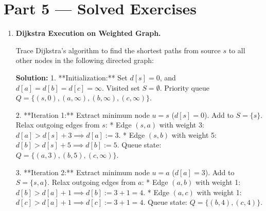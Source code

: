 \documentclass[12pt, a4paper]{book}
\begin{document}
\section{Part 5 --- Solved Exercises}

\begin{problembox}
\begin{enumerate}[label=\textbf{E\arabic*.}]
  \item \textbf{Dijkstra Execution on Weighted Graph.}
  
        Trace Dijkstra's algorithm to find the shortest paths from source $s$ to all other nodes in the following directed graph:
        \begin{center}
        \end{center}
        
        \textbf{Solution:}
        1. **Initialization:**
           Set $d[s] = 0$, and $d[a] = d[b] = d[c] = \infty$.
           Visited set $S = \emptyset$. Priority queue $Q = \{ (s,0), (a,\infty), (b,\infty), (c,\infty) \}$.
           
        2. **Iteration 1:**
           Extract minimum node $u = s$ ($d[s] = 0$). Add to $S = \{s\}$.
           Relax outgoing edges from $s$:
           * Edge $(s, a)$ with weight 3: $d[a] > d[s] + 3 \implies d[a] := 3$.
           * Edge $(s, b)$ with weight 5: $d[b] > d[s] + 5 \implies d[b] := 5$.
           Queue state: $Q = \{ (a,3), (b,5), (c,\infty) \}$.
           
        3. **Iteration 2:**
           Extract minimum node $u = a$ ($d[a] = 3$). Add to $S = \{s, a\}$.
           Relax outgoing edges from $a$:
           * Edge $(a, b)$ with weight 1: $d[b] > d[a] + 1 \implies d[b] := 3 + 1 = 4$.
           * Edge $(a, c)$ with weight 1: $d[c] > d[a] + 1 \implies d[c] := 3 + 1 = 4$.
           Queue state: $Q = \{ (b,4), (c,4) \}$.
           

\end{enumerate}
\end{problembox}
\end{document}
